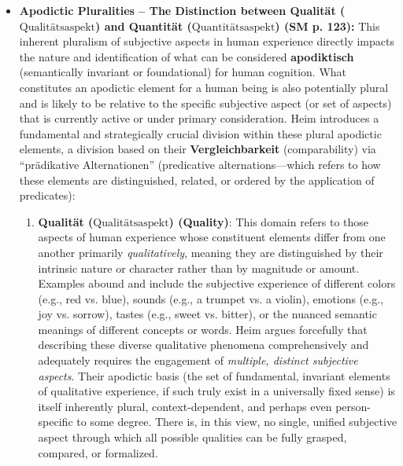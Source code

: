 \documentclass[12pt]{article}
\newcommand{\q}[1]{\enquote{#1}}
\newcommand{\quantitaetsaspekt}{\text{Quantitätsaspekt}}
\newcommand{\qualitaetsaspekt}{\text{Qualitätsaspekt}}
\begin{document}
\begin{itemize}
    \item \textbf{Apodictic Pluralities – The Distinction between Qualität (\(\qualitaetsaspekt\)) and Quantität (\(\quantitaetsaspekt\)) (SM p. 123):}
    This inherent pluralism of subjective aspects in human experience directly impacts the nature and identification of what can be considered \textbf{apodiktisch} (semantically invariant or foundational) for human cognition. What constitutes an apodictic element for a human being is also potentially plural and is likely to be relative to the specific subjective aspect (or set of aspects) that is currently active or under primary consideration.
    Heim introduces a fundamental and strategically crucial division within these plural apodictic elements, a division based on their \textbf{Vergleichbarkeit} (comparability) via \q{prädikative Alternationen} (predicative alternations—which refers to how these elements are distinguished, related, or ordered by the application of predicates):
    \begin{enumerate}
        \item \textbf{Qualität (\(\qualitaetsaspekt\)) (Quality)}: This domain refers to those aspects of human experience whose constituent elements differ from one another primarily \textit{qualitatively}, meaning they are distinguished by their intrinsic nature or character rather than by magnitude or amount. Examples abound and include the subjective experience of different colors (e.g., red vs. blue), sounds (e.g., a trumpet vs. a violin), emotions (e.g., joy vs. sorrow), tastes (e.g., sweet vs. bitter), or the nuanced semantic meanings of different concepts or words. Heim argues forcefully that describing these diverse qualitative phenomena comprehensively and adequately requires the engagement of \textit{multiple, distinct subjective aspects}. Their apodictic basis (the set of fundamental, invariant elements of qualitative experience, if such truly exist in a universally fixed sense) is itself inherently plural, context-dependent, and perhaps even person-specific to some degree. There is, in this view, no single, unified subjective aspect through which all possible qualities can be fully grasped, compared, or formalized.

\end{enumerate}
\end{itemize}
\end{document}
